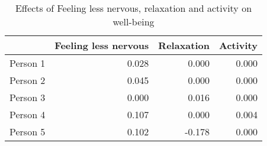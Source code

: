 \begin{table}[ht]
\centering
\begin{tabular}{rrrr}
  \toprule
 & Feeling less nervous & Relaxation & Activity \\ 
  \midrule
Person 1 & 0.028 & 0.000 & 0.000 \\ 
  Person 2 & 0.045 & 0.000 & 0.000 \\ 
  Person 3 & 0.000 & 0.016 & 0.000 \\ 
  Person 4 & 0.107 & 0.000 & 0.004 \\ 
  Person 5 & 0.102 & -0.178 & 0.000 \\ 
   \bottomrule
\end{tabular}
\caption{Effects of Feeling less nervous, relaxation and activity on well-being} 
\label{tab:effects_in_aira}
\end{table}
